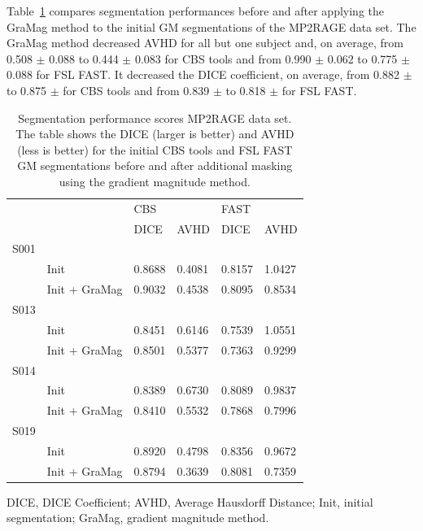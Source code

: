 Table~\ref{table2} compares segmentation performances before and after applying the GraMag method to the initial GM segmentations of the MP2RAGE data set. The GraMag method decreased AVHD for all but one subject and, on average, from 0.508 $\pm$ 0.088 to 0.444 $\pm$ 0.083 for CBS tools and from 0.990 $\pm$ 0.062 to 0.775 $\pm$ 0.088 for FSL FAST. It decreased the DICE coefficient, on average, from 0.882 $\pm$ to 0.875 $\pm$ for CBS tools and from 0.839 $\pm$ to 0.818 $\pm$ for FSL FAST.

\begin{table}[!ht]
\centering
\caption{
Segmentation performance scores MP2RAGE data set. The table shows the DICE (larger is better) and AVHD (less is better) for the initial CBS tools and FSL FAST GM segmentations before and after additional masking using the gradient magnitude method.}
\begin{tabular}{llllll}
\hline
     &                 & \vline CBS   &      & \vline FAST   &      \\
     &                 & \vline DICE  & AVHD & \vline DICE       & AVHD \\
\hline
 S001 &                &            &            &             &             \\
      & Init           & 0.8688     & 0.4081     & 0.8157      & 1.0427      \\
      & Init + GraMag  & 0.9032     & 0.4538     & 0.8095      & 0.8534      \\
 S013 &                &            &            &             &             \\
      & Init           & 0.8451     & 0.6146     & 0.7539      & 1.0551      \\
      & Init + GraMag  & 0.8501     & 0.5377     & 0.7363      & 0.9299      \\
 S014 &                &            &            &             &             \\
      & Init           & 0.8389     & 0.6730     & 0.8089      & 0.9837      \\
      & Init + GraMag  & 0.8410     & 0.5532     & 0.7868      & 0.7996      \\
 S019 &                &            &            &             &             \\
      & Init           & 0.8920     & 0.4798     & 0.8356      & 0.9672      \\
      & Init + GraMag  & 0.8794     & 0.3639     & 0.8081      & 0.7359      \\
\hline
\end{tabular}
\begin{flushleft}
DICE, DICE Coefficient; AVHD, Average Hausdorff Distance; Init, initial segmentation; GraMag, gradient magnitude method.\\
\end{flushleft}
\label{table2}
\end{table}


